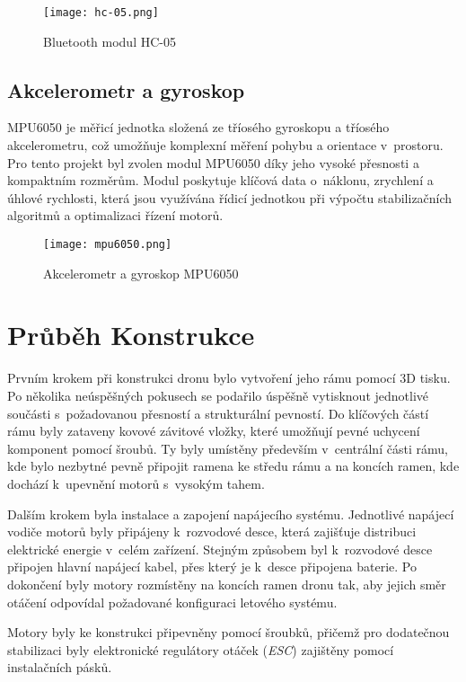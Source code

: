 \documentclass[12pt]{report}
\begin{document}
\begin{figure}[H]
	\centering
	\texttt{[image: hc-05.png]}
	\caption{Bluetooth modul HC-05}
	\label{fig:hc-05.png}
\end{figure}

\section[Akcelerometr a gyroskop]{Akcelerometr a gyroskop}
MPU6050 je měřicí jednotka složená ze tříosého gyroskopu a tříosého akcelerometru, což umožňuje komplexní měření pohybu a orientace v~prostoru. Pro tento projekt byl zvolen modul MPU6050 díky jeho vysoké přesnosti a kompaktním rozměrům. Modul poskytuje klíčová data o~náklonu, zrychlení a úhlové rychlosti, která jsou využívána řídicí jednotkou při výpočtu stabilizačních algoritmů a optimalizaci řízení motorů.

\begin{figure}[H]
	\centering
	\texttt{[image: mpu6050.png]}
	\caption{Akcelerometr a gyroskop MPU6050}
	\label{fig:hc-05.png}
\end{figure}

\chapter[Průběh Konstrukce]{Průběh Konstrukce}
Prvním krokem při konstrukci dronu bylo vytvoření jeho rámu pomocí 3D tisku. Po několika neúspěšných pokusech se podařilo úspěšně vytisknout jednotlivé součásti s~požadovanou přesností a strukturální pevností. Do klíčových částí rámu byly zataveny kovové závitové vložky, které umožňují pevné uchycení komponent pomocí šroubů. Ty byly umístěny především v~centrální části rámu, kde bylo nezbytné pevně připojit ramena ke středu rámu a na koncích ramen, kde dochází k~upevnění motorů s~vysokým tahem.

Dalším krokem byla instalace a zapojení napájecího systému. Jednotlivé napájecí vodiče motorů byly připájeny k~rozvodové desce, která zajišťuje distribuci elektrické energie v~celém zařízení. Stejným způsobem byl k~rozvodové desce připojen hlavní napájecí kabel, přes který je k~desce připojena baterie. Po dokončení byly motory rozmístěny na koncích ramen dronu tak, aby jejich směr otáčení odpovídal požadované konfiguraci letového systému.

Motory byly ke konstrukci připevněny pomocí šroubků, přičemž pro dodatečnou stabilizaci byly elektronické regulátory otáček (\textit{ESC}) zajištěny pomocí instalačních pásků.
\end{document}
